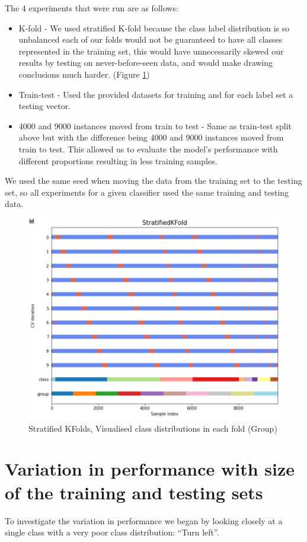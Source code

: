 \documentclass[11pt]{article}
\begin{document}
The 4 experiments that were run are as follows:
\begin{itemize}
  \item K-fold - We used stratified K-fold because the class label distribution is so unbalanced each of our folds would not be guaranteed to have all classes represented in the training set, this would have unnecessarily skewed our results by testing on never-before-seen data, and would make drawing conclusions much harder. (Figure \ref{StratKFold})
  \item Train-test - Used the provided datasets for training and for each label set a testing vector. 
  \item 4000 and 9000 instances moved from train to test - Same as train-test split above but with the difference being 4000  and 9000 instances moved from train to test. This allowed us to evaluate the model’s performance with different proportions resulting in less training samples.
\end{itemize}

We used the same seed when moving the data from the training set to the testing set, so all experiments for a given classifier used the same training and testing data.

\begin{figure}[H]
  \centering 
  \includegraphics[width = \textwidth, height = 0.5\textwidth, keepaspectratio]{Images/StratKFold.png} 
  \caption {Stratified KFolds, Visualised class distributions in each fold (Group)} \label{StratKFold}
\end{figure}

\section{Variation in performance with size of the training and testing sets} \label{sec:VarPerfTrainTestSets}
To investigate the variation in performance we began by looking closely at a single class with a very poor class distribution: “Turn left”.
\end{document}
